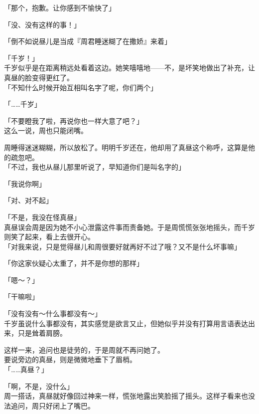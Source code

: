 「那个，抱歉。让你感到不愉快了」

「没、没有这样的事！」

「倒不如说昼儿是当成『周君睡迷糊了在撒娇』来着」

「千岁！」\\

千岁似乎是在距离稍远处看着这边。她笑嘻嘻地——不，是坏笑地做出了补充，让真昼的脸变得更红了。\\

「不知什么时候开始互相叫名字了呢，你们两个」

「……千岁」

「不要瞪我了啦，再说你也一样大意了吧？」\\

这么一说，周也只能闭嘴。

周睡得迷迷糊糊，所以放松了。明明千岁还在，他却用了真昼这个称呼，这算是他的疏忽吧。\\

「不过，我也从昼儿那里听说了，早知道你们是叫名字的」

「我说你啊」

「对、对不起」

「不是，我没在怪真昼」\\

真昼误会周是因为她不小心泄露这件事而责备她。于是周慌慌张张地摇头，而千岁则笑了起来，看上去很开心。\\

「对我来说，只是觉得昼儿和周很要好就再好不过了哦？又不是什么坏事嘛」

「你这家伙疑心太重了，并不是你想的那样」

「嗯～？」

「干嘛啦」

「没有没有～什么事都没有～」\\

千岁虽说什么事都没有，其实感觉是欲言又止，但她似乎并没有打算用言语表达出来，只是耸着肩膀。

这样一来，追问也是徒劳的，于是周就不再问她了。\\

要说旁边的真昼，则是微微地垂下了眉梢。\\

「……真昼？」

「啊，不是，没什么」\\

周一搭话，真昼就好像回过神来一样，慌张地露出笑脸摇了摇头。这样子看来也没法追问，周只好闭上了嘴巴。\\

